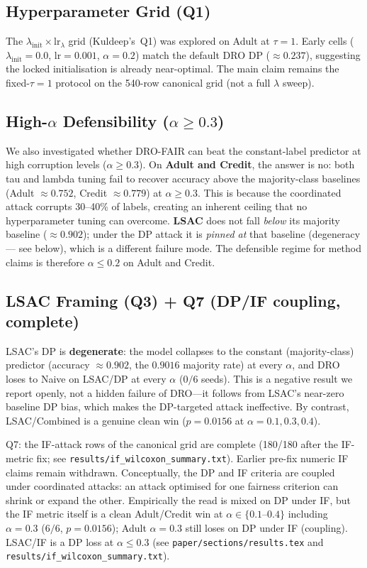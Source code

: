 \documentclass[11pt,a4paper]{article}
\begin{document}
\subsection{Hyperparameter Grid (Q1)}

The $\lambda_{\mathrm{init}}{\times}\mathrm{lr}_{\lambda}$ grid
(Kuldeep's~Q1) was explored on Adult at $\tau{=}1$.  Early cells
($\lambda_{\mathrm{init}}{=}0.0$, $\mathrm{lr}{=}0.001$, $\alpha{=}0.2$)
match the default DRO DP ($\approx0.237$), suggesting the locked
initialisation is already near-optimal.  The main claim remains the
fixed-$\tau{=}1$ protocol on the 540-row canonical grid (not a full
$\lambda$ sweep).

\subsection{High-$\alpha$ Defensibility ($\alpha\ge0.3$)}

We also investigated whether DRO-FAIR can beat the constant-label predictor
at high corruption levels ($\alpha\ge0.3$). On \textbf{Adult and Credit}, the
answer is no: both tau and lambda tuning fail to recover accuracy above the
majority-class baselines (Adult $\approx0.752$, Credit $\approx0.779$) at
$\alpha\ge0.3$.  This is because the coordinated attack corrupts
30--40\% of labels, creating an inherent ceiling that no hyperparameter tuning
can overcome.  \textbf{LSAC} does not fall \emph{below} its majority baseline
($\approx0.902$); under the DP attack it is \emph{pinned at} that baseline
(degeneracy --- see below), which is a different failure mode.  The
defensible regime for method claims is therefore $\alpha\le0.2$ on Adult and
Credit.

\subsection{LSAC Framing (Q3) + Q7 (DP/IF coupling, complete)}

LSAC's DP is \textbf{degenerate}: the model collapses to the
constant (majority-class) predictor (accuracy $\approx0.902$, the
$0.9016$ majority rate) at every $\alpha$, and DRO loses to Naive on
LSAC/DP at every $\alpha$ ($0/6$ seeds).  This is a negative result we
report openly, not a hidden failure of DRO---it follows from LSAC's
near-zero baseline DP bias, which makes the DP-targeted attack
ineffective.  By contrast, LSAC/Combined is a genuine clean win
($p{=}0.0156$ at $\alpha{=}0.1,0.3,0.4$).

Q7: the IF-attack rows of the canonical grid are complete (180/180 after
the IF-metric fix; see \texttt{results/if\_wilcoxon\_summary.txt}).
Earlier pre-fix numeric IF claims remain withdrawn.  Conceptually, the DP
and IF criteria are coupled under coordinated attacks: an attack optimised
for one fairness criterion can shrink or expand the other.  Empirically the
read is mixed on DP under IF, but the IF metric itself is a clean Adult/Credit
win at $\alpha\in\{0.1$--$0.4\}$ including $\alpha{=}0.3$ ($6/6$,
$p{=}0.0156$); Adult $\alpha{=}0.3$ still loses on DP under IF (coupling).
LSAC/IF is a DP loss at $\alpha\le0.3$ (see \texttt{paper/sections/results.tex}
and \texttt{results/if\_wilcoxon\_summary.txt}).
\end{document}
